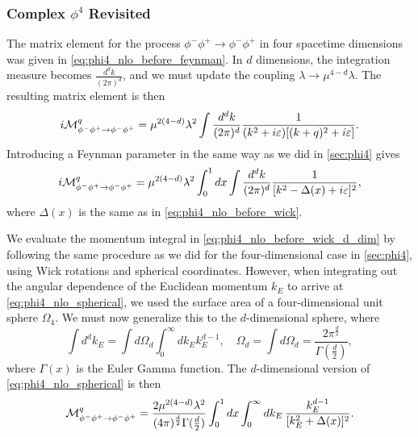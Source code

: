 \subsubsection{Complex $\phi^4$ Revisited}
The matrix element for the process $\phi^-\phi^+\to\phi^-\phi^+$ in four spacetime dimensions was given in \cref{eq:phi4_nlo_before_feynman}.
In $d$ dimensions, the integration measure becomes $\frac{d^dk}{(2\pi)^d}$, and we must update the coupling $\lambda\to\mu^{4-d}\lambda$. The resulting matrix element is then
\begin{equation}\label{eq:phi4_nlo_before_feynman_d_dim}
    i\mathcal{M}_{\phi^-\phi^+\to\phi^-\phi^+}^q = \mu^{2(4-d)} \lambda^2 \int\frac{d^dk}{(2\pi)^d} \frac{1}{(k^2+i\varepsilon)[(k+q)^2+i\varepsilon]}.
\end{equation}
Introducing a Feynman parameter in the same way as we did in \cref{sec:phi4} gives
\begin{equation}\label{eq:phi4_nlo_before_wick_d_dim}
    i\mathcal{M}_{\phi^-\phi^+\to\phi^-\phi^+}^q = \mu^{2(4-d)} \lambda^2 \int_0^1 dx \int\frac{d^dk}{(2\pi)^d} \frac{1}{[k^2 - \Delta(x) + i\varepsilon]^2},
\end{equation}
where $\Delta(x)$ is the same as in \cref{eq:phi4_nlo_before_wick}.

We evaluate the momentum integral in \cref{eq:phi4_nlo_before_wick_d_dim} by following the same procedure as we did for the four-dimensional case in \cref{sec:phi4}, using Wick rotations and spherical coordinates.
However, when integrating out the angular dependence of the Euclidean momentum $k_E$ to arrive at \cref{eq:phi4_nlo_spherical}, we used the surface area of a four-dimensional unit sphere $\Omega_4$. We must now generalize this to the $d$-dimensional sphere, where~\cite{Schwartz:2014sze}
\begin{equation}\label{eq:d_dim_spherical_integral}
    \int d^dk_E=\int d\Omega_d\int_0^\infty dk_E k_E^{d-1},
    \quad
    \Omega_d = \int d\Omega_d = \frac{2\pi^{\frac{d}{2}}}{\Gamma(\frac{d}{2})},
\end{equation}
where $\Gamma(x)$ is the Euler Gamma function. The $d$-dimensional version of \cref{eq:phi4_nlo_spherical} is then
\begin{equation}\label{eq:phi4_nlo_spherical_d_dim}
    \mathcal{M}_{\phi^-\phi^+\to\phi^-\phi^+}^q = \frac{2\mu^{2(4-d)}\lambda^2}{(4\pi)^{\frac{d}{2}}\Gamma(\frac{d}{2})} \int_0^1 dx \int_0^\infty dk_E \, \frac{k_E^{d-1}}{[k_E^2 + \Delta(x)]^2}.
\end{equation}

